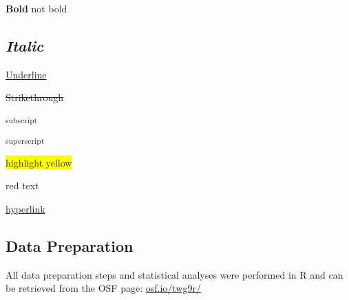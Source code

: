 \documentclass{article}
\begin{document}
	\textbf{Bold }not bold



	\subsection{\emph{Italic}}



	\underline{Underline}



	\sout{Strikethrough}



	\textsubscript{subscript}



	\textsuperscript{superscript}



	\colorbox{yellow}{highlight yellow}



	{\color{FF0000}red text}










	\href{https://hyperlink.com/}{hyperlink}







	\subsection{Data Preparation}



	All data preparation steps and statistical analyses were performed in R \parencites{RCore Team2019} and can be retrieved from the OSF page: \href{https://osf.io/twg9r/}{osf.io/twg9r/}
\end{document}

